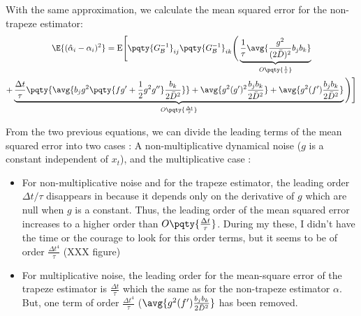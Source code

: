 With the same approximation, we calculate the mean squared error for the non-trapeze estimator:
\begin{multline}
    \E{(\hat{\alpha}_i - \alpha_i)^2} = \mathrm{E}\Bigg[\pqty{G_{\mathcal{B}}^{-1}}_{ij}\pqty{G_{\mathcal{B}}^{-1}}_{ik} \Bigg( \underbrace{\frac{1}{\tau} \avg{\frac{g^2}{(2\bar{D})^2} b_j b_k}}_{O\pqty{\frac{1}{\tau}}}\\
     + \underbrace{\frac{\Delta t}{\tau} \pqty{\avg{b_j g^2 \pqty{fg'+ \frac{1}{2} g^2 g''} \frac{b_k}{2 \bar{D}^2} }} + \avg{g^2 (g')^2 \frac{b_j b_k}{2 \bar{D}^2}} + \avg{g^2 (f') \frac{b_j b_k}{2 \bar{D}^2}} }_{O\pqty{\frac{\Delta t}{\tau}}} \Bigg)   \Bigg]
\end{multline}

From the two previous equations, we can divide the leading terms of the mean squared error into two cases : A non-multiplicative dynamical noise ($g$ is a constant independent of $x_t$), and the multiplicative case :
\begin{itemize}
    \item For non-multiplicative noise and for the trapeze estimator, the leading order $\Delta t/\tau$ disappears in  because it depends only on the derivative of $g$ which are null when $g$ is a constant. Thus, the leading order of the mean squared error increases to a higher order than $O\pqty{\frac{\Delta t}{\tau}}$. During my these, I didn't have the time or the courage to look for this order terms, but it seems to be of order $\frac{\Delta t^4}{\tau}$ (XXX figure)
    \item For multiplicative noise, the leading order for the mean-square error of the trapeze estimator is $\frac{\Delta t}{\tau}$ which the same as for the non-trapeze estimator $\alpha$. But, one term of order $\frac{\Delta t^4}{\tau}$ ($\avg{g^2 (f') \frac{b_j b_k}{2 \bar{D}^2}}$ has been removed. 
\end{itemize}

